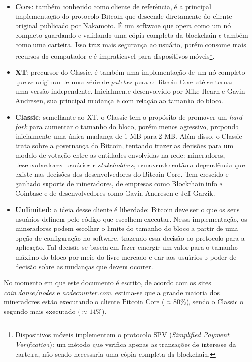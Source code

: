 \begin{itemize}
	\item \textbf{Core}: também conhecido como cliente de referência, é a principal implementação do protocolo Bitcoin que descende diretamente do cliente original publicado por Nakamoto. É um software que opera como um nó completo guardando e validando uma cópia completa da blockchain e também como uma carteira. Isso traz mais segurança ao usuário, porém consome mais recursos do computador e é impraticável para dispositivos móveis\footnote{Dispositivos móveis implementam o protocolo SPV (\textit{Simplified Payment Verification}): um método que verifica apenas as transações de interesse da carteira, não sendo necessária uma cópia completa da blockchain.}.

	\item \textbf{XT}: precursor do Classic, é também uma implementação de um nó completo que se originou de uma série de \textit{patches} para o Bitcoin Core até se tornar uma versão independente. Inicialmente desenvolvido por Mike Hearn e Gavin Andresen, sua principal mudança é com relação ao tamanho do bloco.

	\item \textbf{Classic}: semelhante ao XT, o Classic tem o propósito de promover um \textit{hard fork} para aumentar o tamanho do bloco, porém menos agressivo, propondo inicialmente uma única mudança de 1 MB para 2 MB. Além disso, o Classic trata sobre a governança do Bitcoin, tentando trazer as decisões para um modelo de votação entre as entidades envolvidas na rede: mineradores, desenvolvedores, usuários e \textit{stakeholders}; removendo então a dependência que existe nas decisões dos desenvolvedores do Bitcoin Core. Tem crescido e ganhado suporte de mineradores, de empresas como Blockchain.info e Coinbase e de desenvolvedores como Gavin Andresen e Jeff Garzik.

	\item \textbf{Unlimited}: a ideia desse cliente é liberdade: Bitcoin deve ser o que os seus usuários definem pelo código que escolhem executar. Nessa implementação, os mineradores podem escolher o limite do tamanho do bloco a partir de uma opção de configuração no software, trazendo essa decisão do protocolo para a aplicação. Tal decisão se baseia em fazer emergir um valor para o tamanho máximo do bloco por meio do livre mercado e dar aos usuários o poder de decisão sobre as mudanças que devem ocorrer.
\end{itemize}

No momento em que este documento é escrito, de acordo com os sites \textit{coin.dance/nodes} e \textit{nodecounter.com}, estima-se que a grande maioria dos mineradores estão executando o cliente Bitcoin Core ($\approx 80\%$), sendo o Classic o segundo mais executado ($\approx 14\%$).


